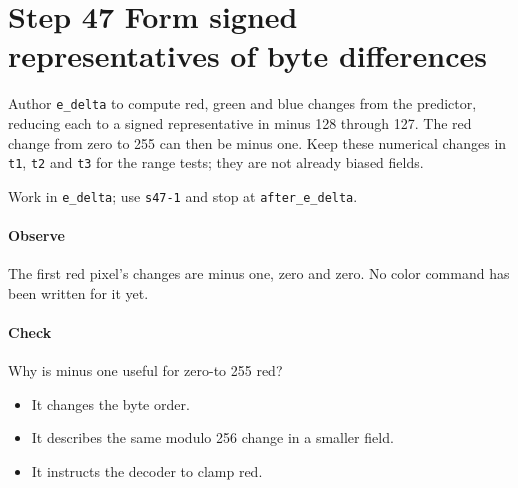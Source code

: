 \section{Step 47 Form signed representatives of byte differences}\label{qoi-s47}
Author \texttt{e\_delta} to compute red, green and blue changes from the predictor, reducing each to a signed representative in minus 128 through 127. The red change from zero to 255 can then be minus one. Keep these numerical changes in \texttt{t1}, \texttt{t2} and \texttt{t3} for the range tests; they are not already biased fields.

Work in \texttt{e\_delta}; use \texttt{s47-1} and stop at \texttt{after\_e\_delta}.

\paragraph{Observe} The first red pixel’s changes are minus one, zero and zero. No color command has been written for it yet.

\paragraph{Check} Why is minus one useful for zero-to 255 red?
\begin{itemize}
\item[A.] It changes the byte order.
\item[B.] It describes the same modulo 256 change in a smaller field.
\item[C.] It instructs the decoder to clamp red.
\end{itemize}
